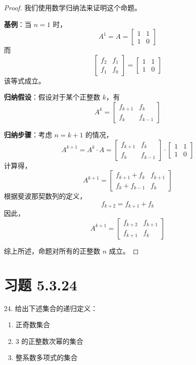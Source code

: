 \documentclass[UTF8]{report}
\theoremstyle{MyLineTheoremStyle} %
\theoremstyle{MyBlockTheoremStyle} %
\theoremstyle{MySubsubsectionStyle} %
\begin{document}
\begin{proof}
    我们使用数学归纳法来证明这个命题。

    \textbf{基例}：当 $n = 1$ 时，
    \[
    A^1 = A = \begin{bmatrix}
        1 & 1 \\
        1 & 0
    \end{bmatrix}
    \]
    而
    \[
    \begin{bmatrix}
        f_{2} & f_1 \\
        f_1 & f_0
    \end{bmatrix}
    = \begin{bmatrix}
        1 & 1 \\
        1 & 0
    \end{bmatrix}
    \]
    该等式成立。

    \textbf{归纳假设}：假设对于某个正整数 $k$，有
    \[
    A^k = \begin{bmatrix}
        f_{k+1} & f_k \\
        f_k & f_{k-1}
    \end{bmatrix}
    \]

    \textbf{归纳步骤}：考虑 $n = k+1$ 的情况，
    \[
    A^{k+1} = A^k \cdot A = \begin{bmatrix}
        f_{k+1} & f_k \\
        f_k & f_{k-1}
    \end{bmatrix} \cdot \begin{bmatrix}
        1 & 1 \\
        1 & 0
    \end{bmatrix}
    \]
    计算得，
    \[
    A^{k+1} = \begin{bmatrix}
        f_{k+1} + f_k & f_{k+1} \\
        f_k + f_{k-1} & f_k
    \end{bmatrix}
    \]
    根据斐波那契数列的定义，
    \[
    f_{k+2} = f_{k+1} + f_k
    \]
    因此，
    \[
    A^{k+1} = \begin{bmatrix}
        f_{k+2} & f_{k+1} \\
        f_{k+1} & f_k
    \end{bmatrix}
    \]

    综上所述，命题对所有的正整数 $n$ 成立。
\end{proof}

\section{习题 5.3.24}
24. 给出下述集合的递归定义：
\begin{enumerate}
    \item 正奇数集合
    \item 3 的正整数次幂的集合
    \item 整系数多项式的集合
\end{enumerate}
\end{document}
